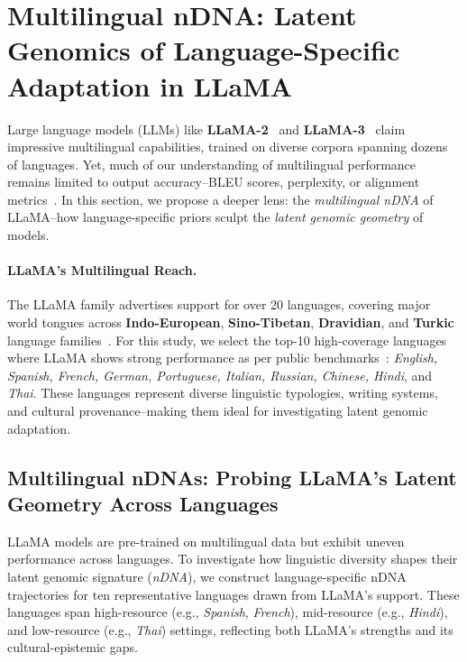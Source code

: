 







\section{Multilingual nDNA: Latent Genomics of Language-Specific Adaptation in LLaMA}

Large language models (LLMs) like \textbf{LLaMA-2}~\citep{touvron2023llama} and \textbf{LLaMA-3}~\citep{dubey2024llama} claim impressive multilingual capabilities, trained on diverse corpora spanning dozens of languages. Yet, much of our understanding of multilingual performance remains limited to output accuracy--BLEU scores, perplexity, or alignment metrics~\citep{liang2023holistic, xu2023aligning}. In this section, we propose a deeper lens: the \emph{multilingual nDNA} of LLaMA--how language-specific priors sculpt the \emph{latent genomic geometry} of models.

\paragraph{LLaMA’s Multilingual Reach.}
The LLaMA family advertises support for over 20 languages, covering major world tongues across \textbf{Indo-European}, \textbf{Sino-Tibetan}, \textbf{Dravidian}, and \textbf{Turkic} language families~\citep{touvron2023llama, dubey2024llama}. For this study, we select the top-10 high-coverage languages where LLaMA shows strong performance as per public benchmarks~\citep{hu2020xtreme, liu2020multilingual}: \emph{English, Spanish, French, German, Portuguese, Italian, Russian, Chinese, Hindi}, and \emph{Thai}. These languages represent diverse linguistic typologies, writing systems, and cultural provenance--making them ideal for investigating latent genomic adaptation.

\subsection{Multilingual nDNAs: Probing LLaMA’s Latent Geometry Across Languages}

LLaMA models are pre-trained on multilingual data but exhibit uneven performance across languages. To investigate how linguistic diversity shapes their latent genomic signature (\emph{nDNA}), we construct language-specific nDNA trajectories for ten representative languages drawn from LLaMA’s support. These languages span high-resource (e.g., \emph{Spanish}, \emph{French}), mid-resource (e.g., \emph{Hindi}), and low-resource (e.g., \emph{Thai}) settings, reflecting both LLaMA’s strengths and its cultural-epistemic gaps.


